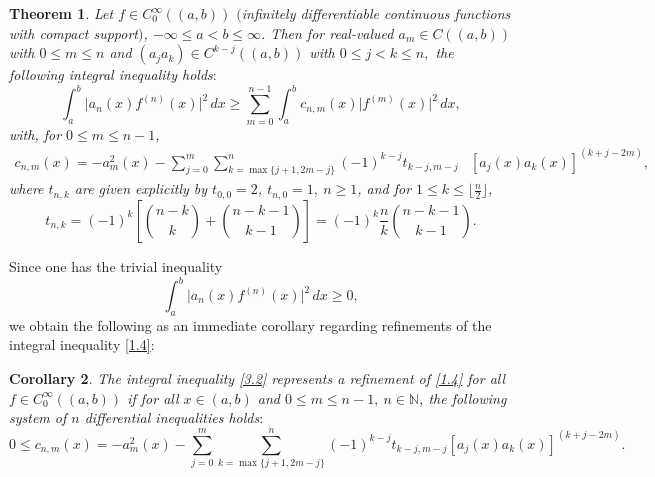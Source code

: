 \documentclass[reqno,10pt,centertags]{amsart}
\newcommand{\bbN}{{\mathbb{N}}}
\numberwithin{equation}{section}
\newtheorem{theorem}{Theorem}[section]
\newtheorem{corollary}[theorem]{Corollary}
\theoremstyle{remark}
\begin{document}
\begin{theorem}\label{t3.2}
Let $f\in C^\infty_0((a,b))$ $($infinitely differentiable continuous functions with compact support$)$, $-\infty\leq a<b\leq\infty$. Then for real-valued $a_m\in C((a,b))$ with $0\leq m\leq n$ 
and $ (a_j a_k)\in C^{k-j}((a,b))$ with $0\leq j< k\leq n,$ the following integral inequality holds$:$
\begin{equation}\label{3.2}
\int_a^b \big|a_n(x)f^{(n)} (x)\big|^2 \, dx\geq  \sum_{m=0}^{n-1}\int_a^b c_{n,m}(x)\big|f^{(m)}(x)\big|^2\, dx, 
\end{equation}
with, for $0\leq m\leq n-1$,
\begin{align}\label{3.6}
c_{n,m}(x)=-a_m^2(x)-\sum_{j=0}^m \sum_{k=\max\{j+1,2m-j\}}^n (-1)^{k-j} t_{k-j,m-j} &[a_j(x)a_k(x)]^{(k+j-2m)},
\end{align}
where $t_{n,k}$ are given explicitly by $t_{0,0}=2$, $t_{n,0} = 1,\ n \geq 1$, and for $1\leq k\leq \lfloor \tfrac{n}{2}\rfloor$,
\begin{equation}
\label{2.13}
t_{n,k}=(-1)^k \left[\binom{n-k}{k}+\binom{n-k-1}{k-1} \right]=(-1)^k \frac{n}{k}\binom{n-k-1}{k-1}.
\end{equation}
\end{theorem}

Since one has the trivial inequality
\begin{equation}\label{1.4}
\int_a^b \big|a_n(x)f^{(n)}(x)\big|^2\, dx\geq0,
\end{equation}
we obtain the following as an immediate corollary regarding refinements of the integral inequality \eqref{1.4}:

\begin{corollary}\label{t3.3}
The integral inequality \eqref{3.2} represents a refinement of \eqref{1.4} for all $f\in C_0^\infty((a,b))$ if  for all $x\in (a,b)$ and $0\leq m\leq n-1,\ n\in\bbN$, the following system of $n$ differential inequalities holds$:$
\begin{equation}\label{diffineq}
0\leq c_{n,m}(x)=-a_m^2(x)-\sum_{j=0}^m \sum_{k=\max\{j+1,2m-j\}}^n (-1)^{k-j} t_{k-j,m-j} [a_j(x)a_k(x)]^{(k+j-2m)}.
\end{equation}
\end{corollary}
\end{document}
